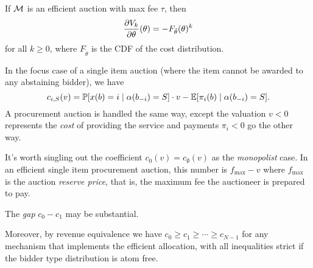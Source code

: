 \begin{proposition}

  If $\mathcal{M}$ is an efficient auction with max fee $\tau$, then
  \[
    \frac{\partial V_k}{\partial\theta} ( \theta ) = -F_{\tilde{\theta}}(\theta)^k
  \]
  for all $k\geq 0$, where $F_{\tilde{\theta}}$ is the CDF of the cost distribution.

\end{proposition}

\begin{example}

  In the focus case of a single item auction (where the item cannot be awarded to any abstaining bidder), we have
  \[
    c_{i,S}(v) = \mathbb{P}[x(b)=i\mid \alpha(b_{-i})=S]\cdot v - \mathbb{E}[\pi_i(b)\mid \alpha(b_{-i})=S].
  \]
  A procurement auction is handled the same way, except the valuation $v<0$ represents the \emph{cost} of providing the service and payments $\pi_i<0$ go the other way.

\end{example}

It's worth singling out the coefficient $c_0(v)=c_\emptyset(v)$ as the \emph{monopolist} case.
%
In an efficient single item procurement auction, this number is $f_{\max}-v$ where $f_{\max}$ is the auction \emph{reserve price}, that is, the maximum fee the auctioneer is prepared to pay.

The \emph{gap} $c_0-c_1$ may be substantial.

Moreover, by revenue equivalence we have $c_0 \geq c_1 \geq \cdots \geq c_{N-1}$ for any mechanism that implements the efficient allocation, with all inequalities strict if the bidder type distribution is atom free.



